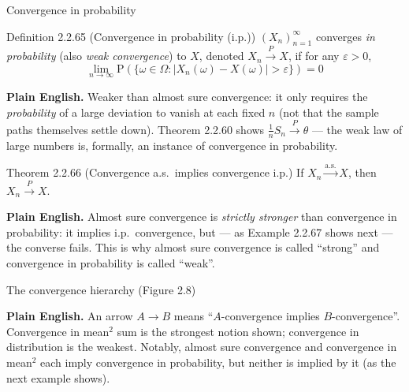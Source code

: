 \documentclass[aspectratio=169,10pt]{beamer}
\begin{document}
\begin{frame}{Convergence in probability}
\begin{block}{Definition 2.2.65 (Convergence in probability (i.p.))}
$(X_n)_{n=1}^\infty$ converges \emph{in probability} (also \emph{weak
convergence}) to $X$, denoted $X_n\xrightarrow{P}X$, if for any $\varepsilon>0$,
\[ \lim_{n\to\infty}\mathrm{P}(\{\omega\in\Omega : |X_n(\omega)-X(\omega)|>\varepsilon\}) = 0 \]
\end{block}
\textbf{Plain English.} Weaker than almost sure convergence: it only
requires the \emph{probability} of a large deviation to vanish at each fixed
$n$ (not that the sample paths themselves settle down). Theorem 2.2.60 shows
$\tfrac1n S_n\xrightarrow{P}\theta$ --- the weak law of large numbers is,
formally, an instance of convergence in probability.

\begin{block}{Theorem 2.2.66 (Convergence a.s.\ implies convergence i.p.)}
If $X_n\xrightarrow{\text{a.s.}}X$, then $X_n\xrightarrow{P}X$.
\end{block}
\textbf{Plain English.} Almost sure convergence is \emph{strictly stronger}
than convergence in probability: it implies i.p.\ convergence, but --- as
Example 2.2.67 shows next --- the converse fails. This is why almost sure
convergence is called ``strong'' and convergence in probability is called
``weak''.
\end{frame}

\begin{frame}{The convergence hierarchy (Figure 2.8)}
\begin{center}
\end{center}
\textbf{Plain English.} An arrow $A\to B$ means ``$A$-convergence implies
$B$-convergence''. Convergence in mean$^2$ sum is the strongest notion
shown; convergence in distribution is the weakest. Notably, almost sure
convergence and convergence in mean$^2$ each imply convergence in
probability, but neither is implied by it (as the next example shows).
\end{frame}
\end{document}
